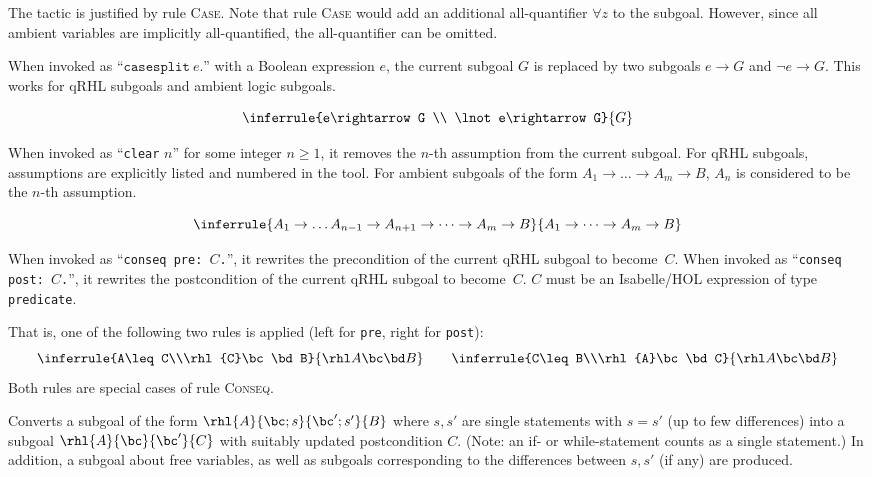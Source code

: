 \documentclass{article}
\renewcommand\ruleref[1]{rule \hbox{\textsc{#1}}}
\begin{document}
The tactic is justified by \ruleref{Case}. Note that \ruleref{Case}
would add an additional all-quantifier $\forall z$
to the subgoal. However, since all ambient variables are implicitly
all-quantified, the all-quantifier can be omitted.



When invoked as ``$\mathtt{casesplit}\ e\mathtt{.}$''
with a Boolean expression $e$,
the current subgoal $G$
is replaced by two subgoals $e\rightarrow G$
and $\lnot e\rightarrow G$.
This works for qRHL subgoals and ambient logic subgoals.

\[
  \inferrule
  {e\rightarrow G
    \\
    \lnot e\rightarrow G}
  {G}
\]


When invoked as ``\texttt{clear} $n$''
for some integer $n\geq 1$,
it removes the $n$-th
assumption from the current subgoal. For qRHL subgoals, assumptions
are explicitly listed and numbered in the tool. For ambient subgoals of the form
$A_1\to \dots \to A_m\to B$,
$A_n$ is considered to be the $n$-th assumption.

\[
  \inferrule
  {A_1\to \dots A_{n-1}\to A_{n+1}\to\dots \to A_m\to B}
  {A_1\to \dots \to A_m\to B}
\]




When invoked as ``\texttt{conseq pre: $C$.}'',
it rewrites the precondition of the current qRHL subgoal to become~$C$.
When invoked as ``\texttt{conseq post: $C$.}'',
it rewrites the postcondition of the current qRHL subgoal to become~$C$.
$C$ must be an Isabelle/HOL expression of type \texttt{predicate}.

That is, one of the following two rules is applied (left for
\texttt{pre}, right for \texttt{post}):
\[
  \inferrule{A\leq C\\\rhl{C}\bc\bd B}{\rhl A\bc\bd B}
  \qquad
  \inferrule{C\leq B\\\rhl{A}\bc\bd C}{\rhl A\bc\bd B}
\]
%
Both rules are special cases of \ruleref{Conseq}.




Converts a subgoal of the form
$\rhl{A}{\bc;s}{\bc';s'}{B}$
where $s,s'$ are single statements with $s=s'$ (up to few differences)
into a subgoal $\rhl{A}{\bc}{\bc'}{C}$
with suitably updated postcondition $C$.
(Note: an if- or while-statement counts as a single statement.)
In addition, a subgoal about free variables,
as well as subgoals corresponding to the differences between $s,s'$ (if any) are produced.
\end{document}

